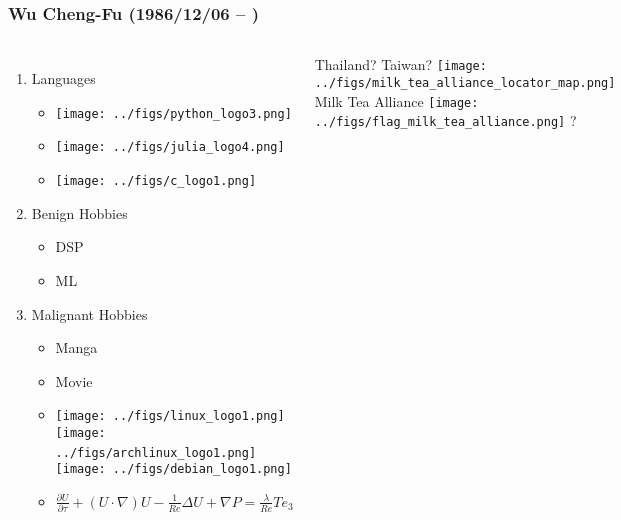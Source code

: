 \documentclass{beamer}
\begin{document}
\begin{frame}
  \frametitle{Wu Cheng-Fu (1986/12/06 -- )}
  \begin{columns}

    \begin{enumerate}
      \item Languages
      \begin{itemize}
        \item \texttt{[image: ../figs/python\_logo3.png]}
        \item \texttt{[image: ../figs/julia\_logo4.png]}
        \item \texttt{[image: ../figs/c\_logo1.png]}
      \end{itemize}

      \item Benign Hobbies
      \begin{itemize}
        \item DSP
        \item ML
      \end{itemize}

      \item Malignant Hobbies
      \begin{itemize}
        \item Manga
        \item Movie
        \item \texttt{[image: ../figs/linux\_logo1.png]}
              \texttt{[image: ../figs/archlinux\_logo1.png]}
              $\!\!\!\!$
              \texttt{[image: ../figs/debian\_logo1.png]}
        \item
          \scriptsize{$\frac{\partial U}{\partial \tau} + (U \cdot \nabla) U - \frac{1}{Re} \Delta U + \nabla P = \frac{\lambda}{Re}T e_3$}

      \end{itemize}

    \end{enumerate}


    Thailand? Taiwan?
    \newline
    \newline
    \texttt{[image: ../figs/milk\_tea\_alliance\_locator\_map.png]}
    \newline
    \newline
    Milk Tea Alliance \texttt{[image: ../figs/flag\_milk\_tea\_alliance.png]} ?
  \end{columns}
\end{frame}
\end{document}
